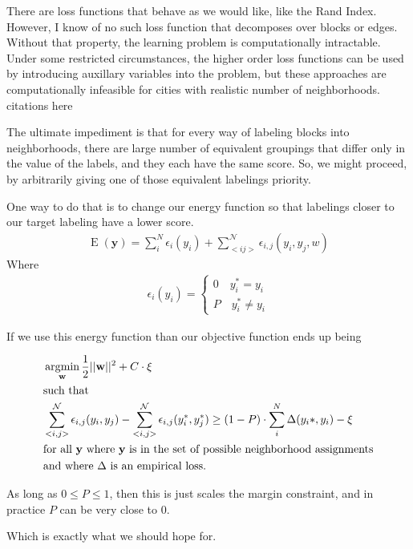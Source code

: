 There are loss functions that behave as we would like, like the Rand
Index. However, I know of no such loss function that decomposes over
blocks or edges. Without that property, the learning problem is
computationally intractable. Under some restricted circumstances, the
higher order loss functions can be used by introducing auxillary
variables into the problem, but these approaches are computationally
infeasible for cities with realistic number of
neighborhoods. {citations here}

The ultimate impediment is that for every way of labeling blocks into
neighborhoods, there are large number of equivalent groupings that
differ only in the value of the labels, and they each have the same
score. So, we might proceed, by arbitrarily giving one of those
equivalent labelings priority.

One way to do that is to change our energy function so that labelings 
closer to our target labeling have a lower score.
%
\begin{align}
\operatorname{E}(\mathbf{y}) = \sum_i^N\epsilon_i(y_i) + \sum_{<i
  j>}^{\mathcal{N}}\epsilon_{i,j}(y_i,y_j,w)
\end{align}
%
Where  
%
\begin{align}
\epsilon_i(y_i) = \begin{cases}
  0 \quad y_i^* = y_i \\
  P \quad y_i^* \neq y_i
\end{cases}
\end{align}

If we use this energy function than our objective function ends up being 

\begin{align*}
&\operatorname*{\arg\!\min}_{\mathbf{w}} \frac{1}{2}||\mathbf{w}||^2 +
  C\cdot\xi\\
&\text{such that} \\
&\sum_{<i,j>}^{\mathcal{N}}\epsilon_{i,j}(y_i,y_j)
   - \sum_{<i,j>}^{\mathcal{N}}\epsilon_{i,j}(y_i^*,y_j^*)  \geq (1-P)\cdot\sum_i^N\Delta(y_i*, y_i) - \xi\\ 
&\text{for all } \mathbf{y} \text{ where } \mathbf{y} \text{ is in the set of
  possible neighborhood assignments}\\
&\text{and where } \Delta \text{ is an empirical loss.}\\
\end{align*}

As long as $0 \leq P \leq 1$, then this is just scales the margin
constraint, and in practice $P$ can be very close to 0.

Which is exactly what we should hope for.

